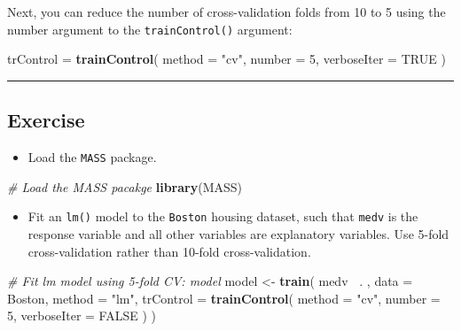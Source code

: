 \documentclass[]{book}
\newenvironment{Shaded}{\begin{snugshade}}{\end{snugshade}}
\newcommand{\KeywordTok}[1]{\textcolor[rgb]{0.13,0.29,0.53}{\textbf{#1}}}
\newcommand{\DataTypeTok}[1]{\textcolor[rgb]{0.13,0.29,0.53}{#1}}
\newcommand{\DecValTok}[1]{\textcolor[rgb]{0.00,0.00,0.81}{#1}}
\newcommand{\StringTok}[1]{\textcolor[rgb]{0.31,0.60,0.02}{#1}}
\newcommand{\CommentTok}[1]{\textcolor[rgb]{0.56,0.35,0.01}{\textit{#1}}}
\newcommand{\OtherTok}[1]{\textcolor[rgb]{0.56,0.35,0.01}{#1}}
\newcommand{\OperatorTok}[1]{\textcolor[rgb]{0.81,0.36,0.00}{\textbf{#1}}}
\newcommand{\NormalTok}[1]{#1}
\providecommand{\tightlist}{%
  \setlength{\itemsep}{0pt}\setlength{\parskip}{0pt}}
\begin{document}
Next, you can reduce the number of cross-validation folds from 10 to 5
using the number argument to the \texttt{trainControl()} argument:

\begin{Shaded}
\begin{Highlighting}[]
\NormalTok{trControl =}\StringTok{ }\KeywordTok{trainControl}\NormalTok{(}
  \DataTypeTok{method =} \StringTok{"cv"}\NormalTok{, }\DataTypeTok{number =} \DecValTok{5}\NormalTok{,}
  \DataTypeTok{verboseIter =} \OtherTok{TRUE}
\NormalTok{)}
\end{Highlighting}
\end{Shaded}

\begin{center}\rule{0.5\linewidth}{\linethickness}\end{center}

\subsection*{Exercise}\label{exercise-6}

\begin{itemize}
\tightlist
\item
  Load the \texttt{MASS} package.
\end{itemize}

\begin{Shaded}
\begin{Highlighting}[]
\CommentTok{# Load the MASS pacakge}
\KeywordTok{library}\NormalTok{(MASS)}
\end{Highlighting}
\end{Shaded}

\begin{itemize}
\tightlist
\item
  Fit an \texttt{lm()} model to the \texttt{Boston} housing dataset,
  such that \texttt{medv} is the response variable and all other
  variables are explanatory variables. Use 5-fold cross-validation
  rather than 10-fold cross-validation.
\end{itemize}

\begin{Shaded}
\begin{Highlighting}[]
\CommentTok{# Fit lm model using 5-fold CV: model}
\NormalTok{model <-}\StringTok{ }\KeywordTok{train}\NormalTok{(}
\NormalTok{  medv }\OperatorTok{~}\NormalTok{. , }\DataTypeTok{data =}\NormalTok{ Boston,}
  \DataTypeTok{method =} \StringTok{"lm"}\NormalTok{,}
  \DataTypeTok{trControl =} \KeywordTok{trainControl}\NormalTok{(}
    \DataTypeTok{method =} \StringTok{"cv"}\NormalTok{, }\DataTypeTok{number =} \DecValTok{5}\NormalTok{,}
    \DataTypeTok{verboseIter =} \OtherTok{FALSE}
\NormalTok{  )}
\NormalTok{)}
\end{Highlighting}
\end{Shaded}
\end{document}
